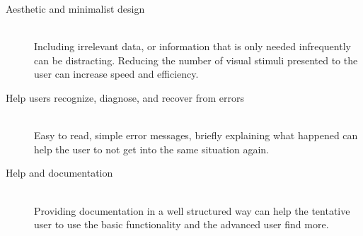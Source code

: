 \begin{description}
	\item[Aesthetic and minimalist design]\hfill \\ Including irrelevant data,
		or information that is only needed infrequently can be distracting.
		Reducing the number of visual stimuli presented to the user can
		increase speed and efficiency.

	\item[Help users recognize, diagnose, and recover from errors]\hfill \\
		Easy to read, simple error messages, briefly explaining what happened
		can help the user to not get into the same situation again.

	\item[Help and documentation]\hfill \\ Providing documentation in a well
		structured way can help the tentative user to use the basic
		functionality and the advanced user find more.

\end{description}
